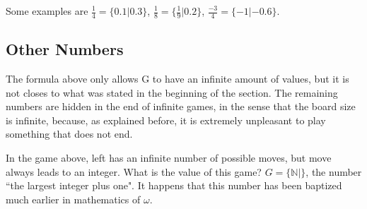\vspace{0.6em}Some examples are $\frac{1}{4} = \{0.1 | 0.3\}$, $\frac{1}{8} = \{\frac{1}{9} | 0.2\}$, $\frac{-3}{4} = \{-1 | -0.6\}$.

\subsection*{Other Numbers}

The formula above only allows G to have an infinite amount of values, but it is not closes to what was stated in the beginning of the section. The remaining numbers are hidden in the end of infinite games, in the sense that the board size is infinite, because, as explained before, it is extremely unpleasant to play something that does not end. 



In the game above, left has an infinite number of possible moves, but  move always leads to an integer. What is the value of this game? $G = \{\mathbb{N} | \}$, the number ``the largest integer plus one". It happens that this number has been baptized much earlier in mathematics of $\omega$.













